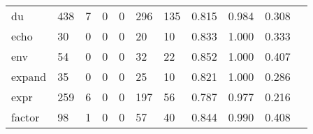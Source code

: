 \begin{longtable}{lp{1.2cm}p{1.2cm}p{1.2cm}p{1.2cm}p{1.2cm}p{1.2cm}p{1.2cm}p{1.2cm}p{1.2cm}p{1.2cm}}
du        &                                   438 &                                                  7 &                                                  0 &                                                  0 &                                                296 &                                                135 &                                              0.815 &                                              0.984 &                                              0.308 \\
echo      &                                    30 &                                                  0 &                                                  0 &                                                  0 &                                                 20 &                                                 10 &                                              0.833 &                                              1.000 &                                              0.333 \\
env       &                                    54 &                                                  0 &                                                  0 &                                                  0 &                                                 32 &                                                 22 &                                              0.852 &                                              1.000 &                                              0.407 \\
expand    &                                    35 &                                                  0 &                                                  0 &                                                  0 &                                                 25 &                                                 10 &                                              0.821 &                                              1.000 &                                              0.286 \\
expr      &                                   259 &                                                  6 &                                                  0 &                                                  0 &                                                197 &                                                 56 &                                              0.787 &                                              0.977 &                                              0.216 \\
factor    &                                    98 &                                                  1 &                                                  0 &                                                  0 &                                                 57 &                                                 40 &                                              0.844 &                                              0.990 &                                              0.408 \\

\end{longtable}
